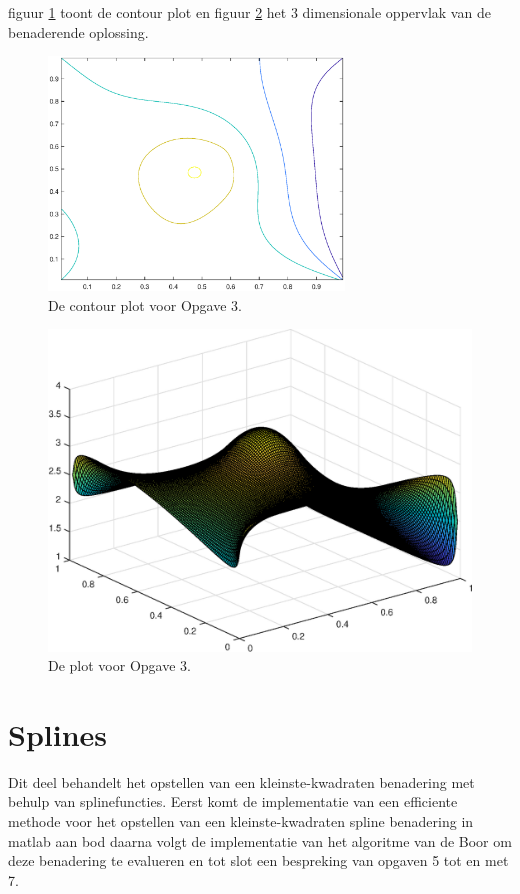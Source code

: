 \documentclass[a4paper]{article}
\begin{document}
figuur \ref{fig:Contour3} toont de contour plot en figuur \ref{fig:Plot3} het 3 dimensionale oppervlak van de benaderende oplossing.
\newpage
\begin{figure}[H]
	\begin{center} 
		\includegraphics[width=0.7\textwidth]{Contour3.eps}
	\end{center}
	\caption{De contour plot voor Opgave 3.}
	\label{fig:Contour3}
\end{figure}

\begin{figure}[H]
	\begin{center} 
		\includegraphics[width=1\textwidth]{Plot3.eps}
	\end{center}
	\caption{De plot voor Opgave 3.}
	\label{fig:Plot3}
\end{figure}
\newpage

\section{Splines}\label{sec:splines}
Dit deel behandelt het opstellen van een kleinste-kwadraten benadering met behulp van splinefuncties. Eerst komt de implementatie van een efficiente methode voor het opstellen van een kleinste-kwadraten spline benadering in matlab aan bod daarna volgt de implementatie van het algoritme van de Boor om deze benadering te evalueren en tot slot een bespreking van opgaven 5 tot en met 7.
\end{document}

